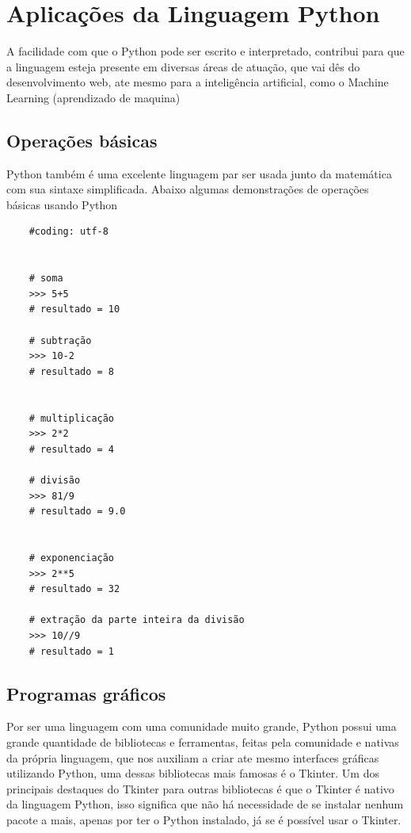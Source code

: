 


\chapter{ Aplica\c{c}\~{o}es da Linguagem Python}

A facilidade com que o Python pode ser escrito e interpretado, contribui para que a linguagem esteja presente em diversas áreas de atuação, que vai dês do desenvolvimento web, ate mesmo para a inteligência artificial, como o Machine Learning (aprendizado de maquina)


    \section{Opera\c{c}\~{o}es b\'{a}sicas}
        Python também é uma excelente linguagem par ser usada junto da matemática com sua sintaxe simplificada.
        Abaixo algumas demonstrações de operações básicas usando Python
        
\begin{lstlisting}
    #coding: utf-8


    # soma
    >>> 5+5
    # resultado = 10
    
    # subtração
    >>> 10-2
    # resultado = 8
    
    
    # multiplicação
    >>> 2*2
    # resultado = 4
    
    # divisão
    >>> 81/9
    # resultado = 9.0
    
    
    # exponenciação
    >>> 2**5
    # resultado = 32
    
    # extração da parte inteira da divisão
    >>> 10//9
    # resultado = 1

\end{lstlisting}

    \section{Programas gr\'{a}ficos}
        Por ser uma linguagem com uma comunidade muito grande, Python possui uma grande quantidade de bibliotecas e ferramentas, feitas pela comunidade e nativas da própria linguagem, que nos auxiliam a criar ate mesmo interfaces gráficas utilizando Python, uma dessas bibliotecas mais famosas é o Tkinter. 
        Um dos principais destaques do Tkinter para outras bibliotecas é que o Tkinter é nativo da linguagem Python, isso significa que não há necessidade de se instalar nenhum pacote a mais, apenas por ter o Python instalado, já se é possível usar o Tkinter.
        
